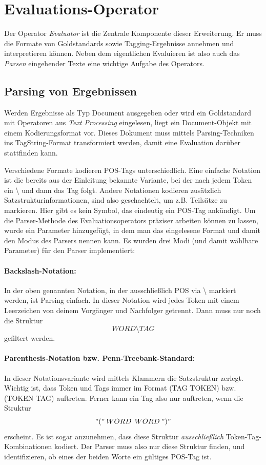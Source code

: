 \section{Evaluations-Operator}
\label{sec:impl:eval}
Der Operator \textit{Evaluator} ist die Zentrale Komponente dieser Erweiterung. Er muss die Formate von Goldstandards sowie Tagging-Ergebnisse annehmen und interpretieren können. Neben dem eigentlichen Evaluieren ist also auch das \textit{Parsen} eingehender Texte eine wichtige Aufgabe des Operators. 

\subsection{Parsing von Ergebnissen}
\label{sec:impl:eval:parsing}
Werden Ergebnisse als Typ Document ausgegeben oder wird ein Goldstandard mit Operatoren aus \textit{Text Processing} eingelesen, liegt ein Document-Objekt mit einem Kodierungsformat vor. Dieses Dokument muss mittels Parsing-Techniken ins TagString-Format transformiert werden, damit eine Evaluation darüber stattfinden kann.

Verschiedene Formate kodieren POS-Tags unterschiedlich. Eine einfache Notation ist die bereits aus der Einleitung bekannte Variante, bei der nach jedem Token ein \glqq \textbackslash \grqq{} und dann das Tag folgt. Andere Notationen kodieren zusätzlich Satzstrukturinformationen, sind also geschachtelt, um z.B. Teilsätze zu markieren. Hier gibt es kein Symbol, das eindeutig ein POS-Tag ankündigt. Um die Parser-Methode des Evaluationsoperators präziser arbeiten können zu lassen, wurde ein Parameter hinzugefügt, in dem man das eingelesene Format und damit den Modus des Parsers nennen kann. Es wurden drei Modi (und damit wählbare Parameter) für den Parser implementiert:

\paragraph{Backslash-Notation:} \cite{Smith} In der oben genannten Notation, in der ausschließlich POS via \glqq \textbackslash \grqq{} markiert werden, ist Parsing einfach. In dieser Notation wird jedes Token mit einem Leerzeichen von deinem Vorgänger und Nachfolger getrennt. Dann muss nur noch die Struktur
\[ WORD \mbox{\textbackslash} TAG\]
gefiltert werden.

\paragraph{Parenthesis-Notation bzw. Penn-Treebank-Standard:} \cite{Paper:PennBank} In dieser Notationsvariante wird mittels Klammern die Satzstruktur zerlegt. Wichtig ist, dass Token und Tags immer im Format \textsc{(TAG TOKEN)} bzw. \textsc{(TOKEN TAG)} auftreten. Ferner kann ein Tag also nur auftreten, wenn die Struktur
\[ "(" \: WORD \:\: WORD \: ")" \]
erscheint. Es ist sogar anzunehmen, dass diese Struktur \textit{ausschließlich} Token-Tag-Kombinationen kodiert. Der Parser muss also nur diese Struktur finden, und identifizieren, ob eines der beiden Worte ein gültiges POS-Tag ist.

